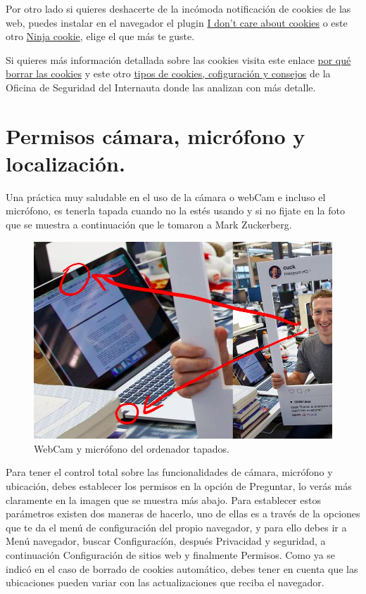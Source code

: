 \documentclass[
  spanish,
  a4paper,
  openany]{book}
\begin{document}
Por otro lado si quieres deshacerte de la incómoda notificación de cookies de las web, puedes instalar en el navegador el plugin \href{https://www.i-dont-care-about-cookies.eu/}{I don't care about cookies} o este otro \href{https://ninja-cookie.com/}{Ninja cookie}, elige el que más te guste.

Si quieres más información detallada sobre las cookies visita este enlace \href{https://www.osi.es/es/actualidad/blog/2019/09/11/por-que-borrar-las-cookies-del-navegador}{por qué borrar las cookies} y este otro \href{https://www.osi.es/es/actualidad/blog/2018/07/18/entre-cookies-y-privacidad}{tipos de cookies, cofiguración y consejos} de la Oficina de Seguridad del Internauta donde las analizan con más detalle.

\hypertarget{permisos-cuxe1mara-micruxf3fono-y-localizaciuxf3n.}{%
\section{Permisos cámara, micrófono y localización.}\label{permisos-cuxe1mara-micruxf3fono-y-localizaciuxf3n.}}

Una práctica muy saludable en el uso de la cámara o webCam e incluso el micrófono, es tenerla tapada cuando no la estés usando y si no fijate en la foto que se muestra a continuación que le tomaron a Mark Zuckerberg.

\begin{figure}

{\centering \includegraphics[width=0.75\linewidth]{images/webca-mark-zuckerberg} 

}

\caption{WebCam y micrófono del ordenador tapados.}\label{fig:unnamed-chunk-6}
\end{figure}

Para tener el control total sobre las funcionalidades de cámara, micrófono y ubicación, debes establecer los permisos en la opción de Preguntar, lo verás más claramente en la imagen que se muestra más abajo. Para establecer estos parámetros existen dos maneras de hacerlo, uno de ellas es a través de la opciones que te da el menú de configuración del propio navegador, y para ello debes ir a Menú navegador, buscar Configuracíón, después Privacidad y seguridad, a continuación Configuración de sitios web y finalmente Permisos. Como ya se indicó en el caso de borrado de cookies automático, debes tener en cuenta que las ubicaciones pueden variar con las actualizaciones que reciba el navegador.
\end{document}
